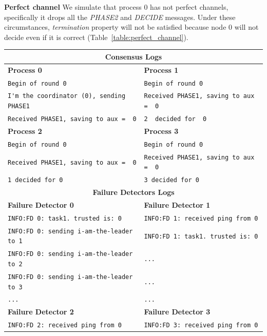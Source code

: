 \documentclass[a4paper]{article}
\begin{document}
\begin{compactitem}
  \item \textbf{Perfect channel} We simulate that process $0$ has not perfect channels, specifically it drops all the \emph{PHASE2} and \emph{DECIDE} messages. Under these circumstances, \emph{termination} property will not be satisfied because node $0$ will not decide even if it is correct (Table~\ref{table:perfect_channel}).
  	\begin{table}[H]
		\centering\scriptsize
        \begin{tabular}{ll}
		\toprule
        \multicolumn{2}{c}{\textbf{Consensus Logs}} \\
        \midrule
		\textbf{Process 0} & \textbf{Process 1} \\
		\hline
        \verb|Begin of round 0| & \verb|Begin of round 0| \\
		\verb|I'm the coordinator (0), sending PHASE1| & \verb|Received PHASE1, saving to aux =  0| \\
		\verb|Received PHASE1, saving to aux =  0| & \verb|2  decided for  0| \\
        \midrule
		\textbf{Process 2} & \textbf{Process 3} \\
		\midrule
        \verb|Begin of round 0| & \verb|Begin of round 0| \\
		\verb|Received PHASE1, saving to aux =  0| & \verb|Received PHASE1, saving to aux =  0| \\
		\verb|1 decided for 0| & \verb|3 decided for 0| \\
        \bottomrule\toprule
		\multicolumn{2}{c}{\textbf{Failure Detectors Logs}} \\
		\midrule
		\textbf{Failure Detector 0} & \textbf{Failure Detector 1} \\
		\midrule
		\verb|INFO:FD 0: task1. trusted is: 0| & \verb|INFO:FD 1: received ping from 0| \\
		\verb|INFO:FD 0: sending i-am-the-leader to 1| & \verb|INFO:FD 1: task1. trusted is: 0| \\
		\verb|INFO:FD 0: sending i-am-the-leader to 2| & \verb|...| \\
		\verb|INFO:FD 0: sending i-am-the-leader to 3| & \verb|...| \\
		\verb|...| & \verb|...| \\
        \midrule
		\textbf{Failure Detector 2} & \textbf{Failure Detector 3} \\
		\midrule
        \verb|INFO:FD 2: received ping from 0| & \verb|INFO:FD 3: received ping from 0| \\

\end{tabular}
\end{table}
\end{compactitem}
\end{document}
